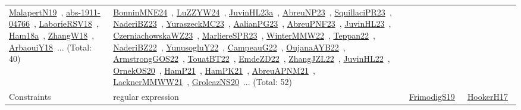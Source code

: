 {\begin{longtable}{lp{3cm}>{\raggedright\arraybackslash}p{6cm}>{\raggedright\arraybackslash}p{6cm}>{\raggedright\arraybackslash}p{8cm}}
\href{../works/MalapertN19.pdf}{MalapertN19}~\cite{MalapertN19}, \href{../works/abs-1911-04766.pdf}{abs-1911-04766}~\cite{abs-1911-04766}, \href{../works/LaborieRSV18.pdf}{LaborieRSV18}~\cite{LaborieRSV18}, \href{../works/Ham18a.pdf}{Ham18a}~\cite{Ham18a}, \href{../works/ZhangW18.pdf}{ZhangW18}~\cite{ZhangW18}, \href{../works/ArbaouiY18.pdf}{ArbaouiY18}~\cite{ArbaouiY18}... (Total: 40) & \href{../works/BonninMNE24.pdf}{BonninMNE24}~\cite{BonninMNE24}, \href{../works/LuZZYW24.pdf}{LuZZYW24}~\cite{LuZZYW24}, \href{../works/JuvinHL23a.pdf}{JuvinHL23a}~\cite{JuvinHL23a}, \href{../works/AbreuNP23.pdf}{AbreuNP23}~\cite{AbreuNP23}, \href{../works/SquillaciPR23.pdf}{SquillaciPR23}~\cite{SquillaciPR23}, \href{../works/NaderiBZ23.pdf}{NaderiBZ23}~\cite{NaderiBZ23}, \href{../works/YuraszeckMC23.pdf}{YuraszeckMC23}~\cite{YuraszeckMC23}, \href{../works/AalianPG23.pdf}{AalianPG23}~\cite{AalianPG23}, \href{../works/AbreuPNF23.pdf}{AbreuPNF23}~\cite{AbreuPNF23}, \href{../works/JuvinHL23.pdf}{JuvinHL23}~\cite{JuvinHL23}, \href{../works/CzerniachowskaWZ23.pdf}{CzerniachowskaWZ23}~\cite{CzerniachowskaWZ23}, \href{../works/MarliereSPR23.pdf}{MarliereSPR23}~\cite{MarliereSPR23}, \href{../works/WinterMMW22.pdf}{WinterMMW22}~\cite{WinterMMW22}, \href{../works/Teppan22.pdf}{Teppan22}~\cite{Teppan22}, \href{../works/NaderiBZ22.pdf}{NaderiBZ22}~\cite{NaderiBZ22}, \href{../works/YunusogluY22.pdf}{YunusogluY22}~\cite{YunusogluY22}, \href{../works/CampeauG22.pdf}{CampeauG22}~\cite{CampeauG22}, \href{../works/OujanaAYB22.pdf}{OujanaAYB22}~\cite{OujanaAYB22}, \href{../works/ArmstrongGOS22.pdf}{ArmstrongGOS22}~\cite{ArmstrongGOS22}, \href{../works/TouatBT22.pdf}{TouatBT22}~\cite{TouatBT22}, \href{../works/EmdeZD22.pdf}{EmdeZD22}~\cite{EmdeZD22}, \href{../works/ZhangJZL22.pdf}{ZhangJZL22}~\cite{ZhangJZL22}, \href{../works/JuvinHL22.pdf}{JuvinHL22}~\cite{JuvinHL22}, \href{../works/OrnekOS20.pdf}{OrnekOS20}~\cite{OrnekOS20}, \href{../works/HamP21.pdf}{HamP21}~\cite{HamP21}, \href{../works/HamPK21.pdf}{HamPK21}~\cite{HamPK21}, \href{../works/AbreuAPNM21.pdf}{AbreuAPNM21}~\cite{AbreuAPNM21}, \href{../works/LacknerMMWW21.pdf}{LacknerMMWW21}~\cite{LacknerMMWW21}, \href{../works/GroleazNS20.pdf}{GroleazNS20}~\cite{GroleazNS20}... (Total: 52)\\
Constraints & regular expression &  & \href{../works/FrimodigS19.pdf}{FrimodigS19}~\cite{FrimodigS19} & \href{../works/HookerH17.pdf}{HookerH17}~\cite{HookerH17}\\

\end{longtable}}
